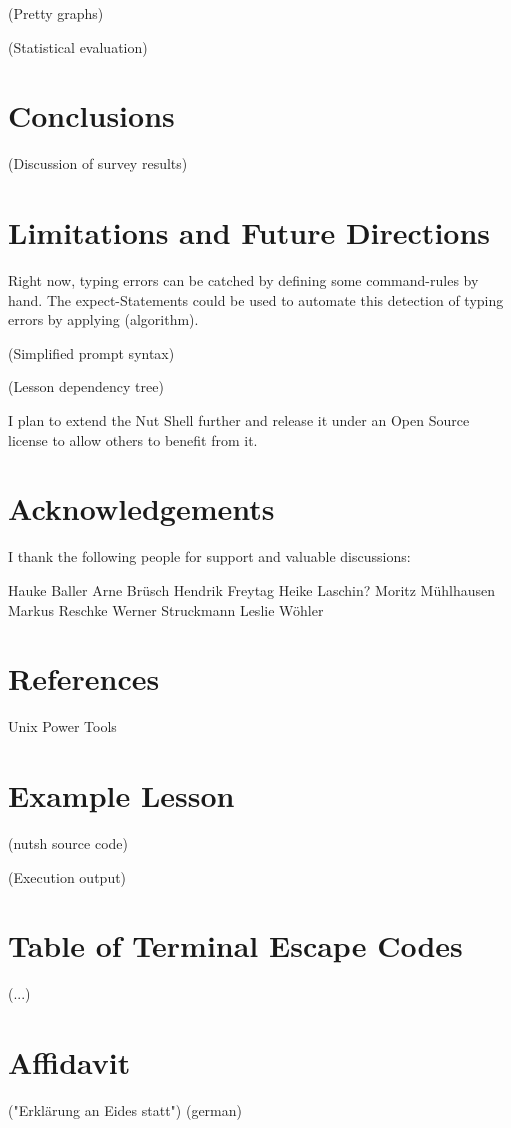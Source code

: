 \documentclass[twoside]{scrreprt}
\begin{document}
(Pretty graphs)

(Statistical evaluation)

\chapter{Conclusions}

(Discussion of survey results)

\chapter{Limitations and Future Directions}

Right now, typing errors can be catched by defining some command-rules by hand. The expect-Statements could be used to automate this detection of typing errors by applying (algorithm).

    (Simplified prompt syntax)

    (Lesson dependency tree)

I plan to extend the Nut Shell further and release it under an Open Source license to allow others to benefit from it.

\chapter{Acknowledgements}

I thank the following people for support and valuable discussions:

Hauke Baller
Arne Brüsch
Hendrik Freytag
Heike Laschin?
Moritz Mühlhausen
Markus Reschke
Werner Struckmann
Leslie Wöhler

\chapter{References}

Unix Power Tools

\appendix

\chapter{Example Lesson}

(nutsh source code)

(Execution output)

\chapter{Table of Terminal Escape Codes}

(...)

\chapter*{Affidavit}

("Erklärung an Eides statt")
\vspace{8em}
(german)
\end{document}
